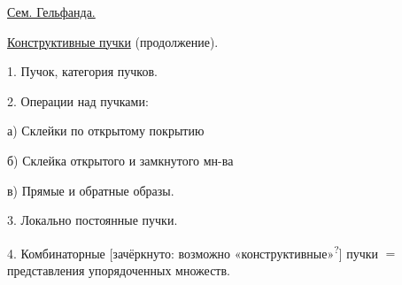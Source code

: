 
\qquad \uline{Сем. Гельфанда.}

\qquad
\uline{Конструктивные пучки} (продолжение).


1. Пучок, категория пучков.

2. Операции над пучками:

\hspace*{2em}а) Склейки по открытому покрытию

\hspace*{2em}б) Склейка открытого и замкнутого мн-ва

\hspace*{2em}в) Прямые и обратные образы.

3. Локально постоянные пучки.

4. Комбинаторные
[зачёркнуто:
возможно «конструктивные»\textsuperscript{?}]
пучки \(=\) представления упорядоченных множеств.


